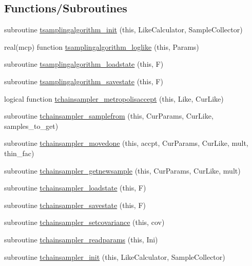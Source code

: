 \subsection*{Functions/\+Subroutines}
\begin{DoxyCompactItemize}
\item 
subroutine \mbox{\hyperlink{namespacemontecarlo_a6f22bd1167c2571095e2d1610a5b6d9b}{tsamplingalgorithm\+\_\+init}} (this, Like\+Calculator, Sample\+Collector)
\item 
real(mcp) function \mbox{\hyperlink{namespacemontecarlo_a7dd4e2ca3d6d99401730978c1b3a6638}{tsamplingalgorithm\+\_\+loglike}} (this, Params)
\item 
subroutine \mbox{\hyperlink{namespacemontecarlo_a2c622f23ed852d71991b99be82a86450}{tsamplingalgorithm\+\_\+loadstate}} (this, F)
\item 
subroutine \mbox{\hyperlink{namespacemontecarlo_a78f12d9f7d6f2a3ac0d492a9b3d7ec9a}{tsamplingalgorithm\+\_\+savestate}} (this, F)
\item 
logical function \mbox{\hyperlink{namespacemontecarlo_a61aacaca86a2550ede828d05b6b4a00f}{tchainsampler\+\_\+metropolisaccept}} (this, Like, Cur\+Like)
\item 
subroutine \mbox{\hyperlink{namespacemontecarlo_ae6147d7e7b017c36b225c6b101d896bd}{tchainsampler\+\_\+samplefrom}} (this, Cur\+Params, Cur\+Like, samples\+\_\+to\+\_\+get)
\item 
subroutine \mbox{\hyperlink{namespacemontecarlo_a51f39aa0229577c81fd7299edea28876}{tchainsampler\+\_\+movedone}} (this, accpt, Cur\+Params, Cur\+Like, mult, thin\+\_\+fac)
\item 
subroutine \mbox{\hyperlink{namespacemontecarlo_acea9a6722742a39deefda7f94ecd49bb}{tchainsampler\+\_\+getnewsample}} (this, Cur\+Params, Cur\+Like, mult)
\item 
subroutine \mbox{\hyperlink{namespacemontecarlo_a828a7ad845f1b5a7f01bfb3ccc95ac32}{tchainsampler\+\_\+loadstate}} (this, F)
\item 
subroutine \mbox{\hyperlink{namespacemontecarlo_ac9b47ebdfecc65b4663d59c74da8e573}{tchainsampler\+\_\+savestate}} (this, F)
\item 
subroutine \mbox{\hyperlink{namespacemontecarlo_aac962ce86a301904d17d4fad89a3f188}{tchainsampler\+\_\+setcovariance}} (this, cov)
\item 
subroutine \mbox{\hyperlink{namespacemontecarlo_af71e0b87a06570ba3678ee96cd444f6e}{tchainsampler\+\_\+readparams}} (this, Ini)
\item 
subroutine \mbox{\hyperlink{namespacemontecarlo_a0eb56d8656442c96e8f066453a7b5209}{tchainsampler\+\_\+init}} (this, Like\+Calculator, Sample\+Collector)

\end{DoxyCompactItemize}
